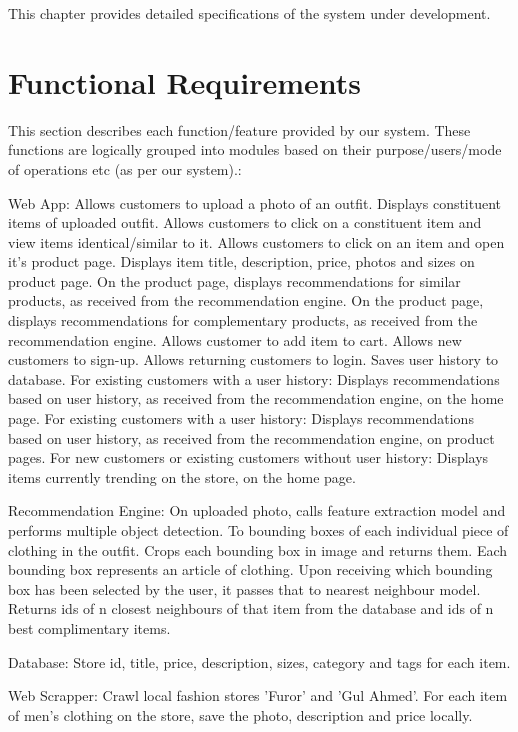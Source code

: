 This chapter provides detailed specifications of the system under development.

\section{Functional Requirements}

This section describes each function/feature provided by our system. These functions are logically grouped into modules based on their purpose/users/mode of operations etc (as per our system).:
\begin{outline}
  \1 Web App:
  \2 Allows customers to upload a photo of an outfit.
  \2 Displays constituent items of uploaded outfit.
  \2 Allows customers to click on a constituent item and view items identical/similar to it.
  \2 Allows customers to click on an item and open it's product page.
  \2 Displays item title, description, price, photos and sizes on product page.
  \2 On the product page, displays recommendations for similar products, as received from the recommendation engine.
  \2 On the product page, displays recommendations for complementary products, as received from the recommendation engine.
  \2 Allows customer to add item to cart.
  \2 Allows new customers to sign-up.
  \2 Allows returning customers to login.
  \2 Saves user history to database.
  \2 For existing customers with a user history: Displays recommendations based on user history, as received from the recommendation engine, on the home page.
  \2 For existing customers with a user history: Displays recommendations based on user history, as received from the recommendation engine, on product pages.
  \2 For new customers or existing customers without user history: Displays items currently trending on the store, on the home page.
  
  \1 Recommendation Engine:
  \2 On uploaded photo, calls feature extraction model and performs multiple object detection. To bounding boxes of each individual piece of clothing in the outfit.
  \2 Crops each bounding box in image and returns them. Each bounding box represents an article of clothing.
  \2 Upon receiving which bounding box has been selected by the user, it passes that to nearest neighbour model. Returns ids of n closest neighbours of that item from the database and ids of n best complimentary items.
  
  \1 Database:
  \2 Store id, title, price, description, sizes, category and tags for each item.
  
  \1 Web Scrapper:
  \2 Crawl local fashion stores 'Furor' and 'Gul Ahmed'.
  \2 For each item of men's clothing on the store, save the photo, description and price locally.
  
  
  
  
\end{outline}

